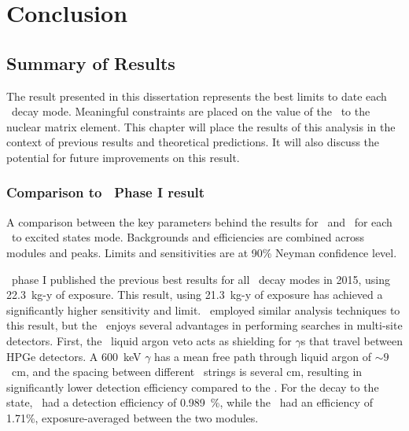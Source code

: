 \documentclass[/main.tex]{subfiles}
\begin{document}
\graphicspath{{./pics/}{ch6/pics/}}

\onlyinsubfile{\textpages}
\chapter{Conclusion}
\section{Summary of Results}
The result presented in this dissertation represents the best limits to date each  \bbes\ decay mode.
Meaningful constraints are placed on the value of the \bbes\ to the  nuclear matrix element.
This chapter will place the results of this analysis in the context of previous results and theoretical predictions.
It will also discuss the potential for future improvements on this result.

\subsection{Comparison to \Gerda\ Phase I result}
\begin{table}[t]
  \centering
  \caption[Comparison between results from the \MJD\ and \Gerda]{\label{tab:mjdgerdacomp}
    A comparison between the key parameters behind the results for \MJD\ and \Gerda\ for each \tnbb\ to excited states mode. Backgrounds and efficiencies are combined across modules and peaks. Limits and sensitivities are at 90\% Neyman confidence level.
  }
  
  
\end{table}
\Gerda\ phase I published the previous best results for all \tnbb\ decay modes in 2015, using 22.3~kg-y of exposure\cite{gerdaESresult}.
This result, using 21.3~kg-y of exposure has achieved a significantly higher sensitivity and limit.
\Gerda\ employed similar analysis techniques to this result, but the \MJD\ enjoys several advantages in performing searches in multi-site detectors.
First, the \Gerda\ liquid argon veto acts as shielding for $\gamma$s that travel between HPGe detectors.
A 600~keV $\gamma$ has a mean free path through liquid argon of $\sim9$~cm, and the spacing between different \Gerda\ strings is several cm, resulting in significantly lower detection efficiency compared to the \MJD.
For the decay to the  state, \Gerda\ had a detection efficiency of 0.989~\%, while the \MJD\ had an efficiency of 1.71\%, exposure-averaged between the two modules.
\end{document}
